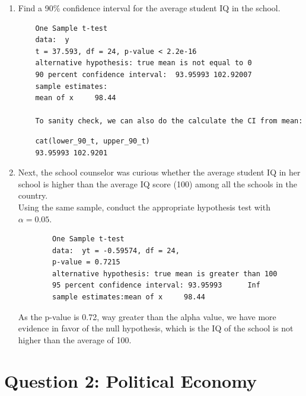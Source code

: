 \documentclass[12pt,letterpaper]{article}
\begin{document}
\begin{enumerate}
	\item Find a 90\% confidence interval for the average student IQ in the school.\\
	  
	
	\begin{verbatim}
	One Sample t-test
	data:  y
	t = 37.593, df = 24, p-value < 2.2e-16
	alternative hypothesis: true mean is not equal to 0
	90 percent confidence interval:  93.95993 102.92007
	sample estimates:
	mean of x     98.44 	
	
	To sanity check, we can also do the calculate the CI from mean:

	\end{verbatim}
	  
	\begin{verbatim}
	cat(lower_90_t, upper_90_t)
	93.95993 102.9201
	\end{verbatim}
	\vspace{.5cm}
	
	
	\item Next, the school counselor was curious  whether  the average student IQ in her school is higher than the average IQ score (100) among all the schools in the country.\\ 

	\noindent Using the same sample, conduct the appropriate hypothesis test with $\alpha=0.05$.
	
		  
	\begin{verbatim}
		One Sample t-test
		data:  yt = -0.59574, df = 24, 
		p-value = 0.7215
		alternative hypothesis: true mean is greater than 100
		95 percent confidence interval: 93.95993      Inf
		sample estimates:mean of x     98.44 
	\end{verbatim}
	\noindent As the p-value is 0.72, way greater than the alpha value, we have more evidence in favor of the null hypothesis, which is the IQ of the school is not higher than the average of 100. 

\end{enumerate}

\newpage

	\section*{Question 2: Political Economy}
\end{document}

